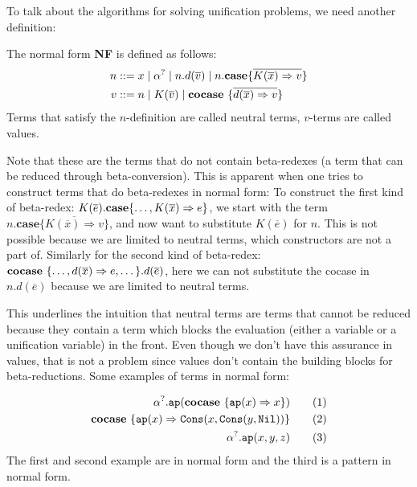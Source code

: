 \documentclass[twoside,12pt,a4paper]{article}
\begin{document}
To talk about the algorithms for solving unification problems, we need another definition: %
\begin{definition}
    The normal form \textbf{NF} is defined as follows:
    \begin{align*}
        n &::= x \;|\; \alpha^? \;|\; n.d(\overline{v})\;|\; n.\textbf{case}\{\overline{K(\overline{x})\Rightarrow v}\}\\
        v &::= n \;|\; K(\overline{v}) \;|\; \textbf{cocase}\ \{\overline{d(\overline{x})\Rightarrow v}\}
    \end{align*}
    Terms that satisfy the $n$-definition are called neutral terms, $v$-terms are called values.
\end{definition}
Note that these are the terms that do not contain beta-redexes (a term that can be reduced through beta-conversion).
This is apparent when one tries to construct terms that do beta-redexes in normal form: 
To construct the first kind of beta-redex: $K(\overline{e}).\textbf{case}\{\dots,K(\overline{x})\Rightarrow e\}$,
we start with the term $n.\textbf{case}\{\overline{K(\overline{x})\Rightarrow v}\}$, and now want to substitute $K(\overline{e})$ for $n$. 
This is not possible because we are limited to neutral terms, which constructors are not a part of.
Similarly for the second kind of beta-redex:
$\textbf{cocase}\ \{\dots,d(\overline{x}) \Rightarrow e, \dots\}.d(\overline{e})$, 
here we can not substitute the cocase in $n.d(\overline{e})$ because we are limited to neutral terms.
        
This underlines the intuition that neutral terms are terms that cannot be reduced because
they contain a term which blocks the evaluation (either a variable or a unification variable) in the front.
Even though we don't have this assurance in values, that is not a problem since values don't contain the building blocks for beta-reductions. 
Some examples of terms in normal form: 
\begin{example}
\begin{align*}
    \alpha^?.\texttt{ap}(\textbf{cocase}\ \{\texttt{ap}(x)\Rightarrow x\}) \tag{1}\\
    \textbf{cocase}\ \{\texttt{ap}(x)\Rightarrow \mathtt{Cons(\mathnormal{x}, Cons(\mathnormal{y}, Nil))}\} \tag{2}\\
    \alpha^?.\texttt{ap}(x, y, z) \tag{3}    
\end{align*}
The first and second example are in normal form and the third is a pattern in normal form.
\end{example}
\end{document}
